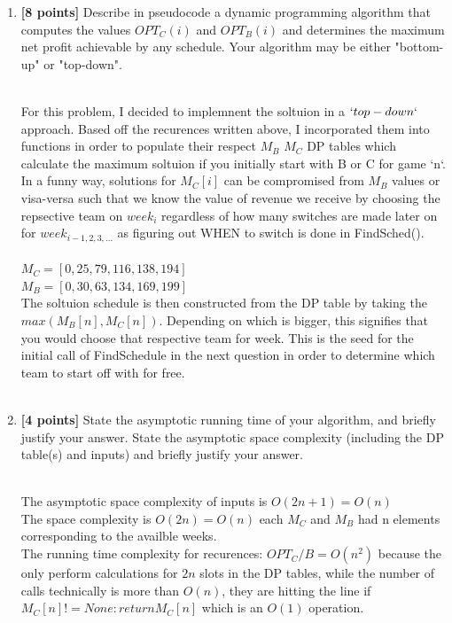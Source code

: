 \documentclass[11pt]{article}
\theoremstyle{definition}
\theoremstyle{theorem}
\newcommand{\solution}{\medskip\noindent{\color{DarkBlue}\textbf{Solution:}}}
\begin{document}
\begin{enumerate}[label=(\alph*)]
\item \textbf{[8 points]}  Describe in pseudocode a dynamic programming algorithm that computes the values $OPT_C(i)$ and $OPT_B(i)$ and determines the maximum net profit achievable by any schedule. Your algorithm may be either "bottom-up" or "top-down".

\solution \\



For this problem, I decided to implemnent the soltuion in a $`top-down`$ approach. 
Based off the recurences written above, I incorporated them into functions in order 
to populate their respect $M_B$ $M_C$ DP tables which calculate the maximum soltuion
 if you initially start with B or C for game `n`. In a funny way, solutions for $M_C[i]$ can be compromised from $M_B$ values or visa-versa such that we know the value of revenue we receive by choosing the repsective team on $week_i$ regardless of how many switches are made later on for $week_{i-1,2,3,...}$ as figuring out WHEN to switch is done in FindSched().\\
\\$M_C = [0, 25, 79, 116, 138, 194]$\\$M_B = [0, 30, 63, 134, 169, 199]$ \\

The soltuion schedule is then constructed from the DP table by taking the $max(M_B[n], M_C[n])$. Depending on which is bigger, this signifies that you would choose that respective team for week. This is the seed for the initial call of FindSchedule in the next question in order to determine which team to start off with for free. \\\\

\item \textbf{[4 points]} State the asymptotic running time of your algorithm, and briefly justify your answer. State the asymptotic space complexity (including the DP table(s) and inputs) and briefly justify your answer.

\solution \\ 
The asymptotic space complexity of inputs is $O(2n+1) = O(n)$\\
The space complexity is $O(2n) = O(n)$ each $M_C$ and $M_B$ had n elements corresponding to the availble weeks.\\
The running time complexity for recurences: $OPT_C/B = O(n^2)$ because the only perform calculations for $2n$ slots in the DP tables, while the number of calls technically is more than  
$O(n)$, they are hitting the line if $M_C[n] != None: return M_C[n]$ which is an $O(1)$ operation. 


\end{enumerate}
\end{document}

